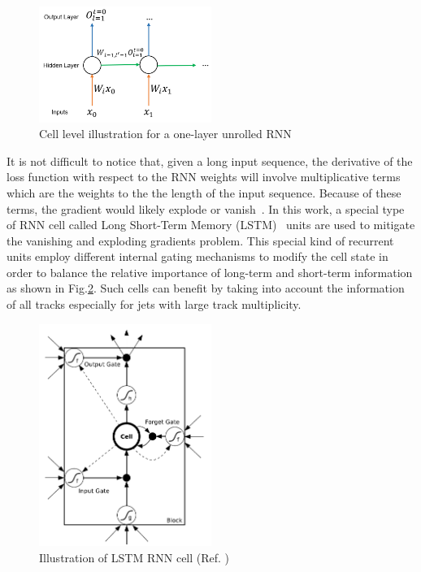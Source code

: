 \begin{figure}[htbp]
  \centering
   \includegraphics[width=0.5\textwidth]{figures/RNN/RNNIlustration.png}
\caption{Cell level illustration for a one-layer unrolled RNN}
  \label{fig:rnn_ilustration}
\end{figure}



It is not difficult to notice that, given a long input sequence, the derivative of the loss function with respect to the RNN weights will involve multiplicative terms which are the weights to the the length of the input sequence. Because of these terms, the gradient would likely explode or vanish~\cite{hochreiter1991untersuchungen,Bengio:1994:LLD:2325857.2328340,DBLP:journals/corr/abs-1211-5063}. In this work, a special type of RNN cell called Long Short-Term Memory (LSTM)~\cite{ref:LSTM} units are used to mitigate the vanishing and exploding gradients problem. This special kind of recurrent units employ different internal gating mechanisms to modify the cell state in order to balance the relative importance of long-term and short-term information as shown in Fig.\ref{fig:lstm_cell}. Such cells can benefit \btagging by taking into account the information of all tracks especially for jets with large track multiplicity. 


\begin{figure}[htbp]
  \centering
   \includegraphics[width=0.5\textwidth]{figures/RNN/LSTM.png}
\caption{Illustration of LSTM RNN cell (Ref. \cite{ref:RNNthesis})}
  \label{fig:lstm_cell}
\end{figure}
